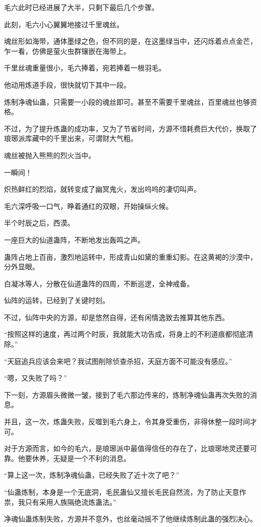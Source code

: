 \begin{this_body}
毛六此时已经进展了大半，只剩下最后几个步骤。

此刻，毛六小心翼翼地接过千里魂丝。

魂丝形如海带，通体墨绿之色，但不同的是，在这墨绿当中，还闪烁着点点金芒，乍一看，仿佛是萤火虫群镶嵌在海带上。

千里丝魂重量很小，毛六捧着，宛若捧着一根羽毛。

他动用炼道手段，很快就切下其中一段。

炼制净魂仙蛊，只需要一小段的魂丝即可。甚至不需要千里魂丝，百里魂丝也够资格。

不过，为了提升炼蛊的成功率，又为了节省时间，方源不惜耗费巨大代价，换取了琅琊派库藏中的千里出来，可谓财大气粗。

魂丝被抛入熊熊的烈火当中。

一瞬间！

炽热鲜红的烈焰，就转变成了幽冥鬼火，发出呜呜的凄切叫声。

毛六深呼吸一口气，睁着通红的双眼，开始操纵火候。

半个时辰之后，西漠。

一座巨大的仙道蛊阵，不断地发出轰鸣之声。

蛊阵占地上百亩，激烈地运转中，形成青山如黛的重重幻影。在这黄褐的沙漠中，分外显眼。

白凝冰等人，分散在仙道蛊阵的四周，不断巡逻，全神戒备。

仙阵的运转，已经到了关键时刻。

不过，仙阵中央的方源，却是悠然自得，还有闲情逸致去推算其他东西。

“按照这样的速度，再过两个时辰，我就能大功告成，将身上的不利道痕都彻底清除。”

“天庭追兵应该会来吧？我试图削除侦查杀招，天庭方面不可能没有感应。”

“嗯，又失败了吗？”

下一刻，方源眉头微微一皱，接到了毛六那边传来的，炼制净魂仙蛊再次失败的消息。

并且，这一次，炼蛊失败，反噬到毛六身上，令其身受重伤，非得休整一段时间才可。

对于方源而言，如今的毛六，是琅琊派中最值得信任的存在了，比琅琊地灵还要可靠。他要休养，无疑是一个不利的消息。

“算上这一次，炼制净魂仙蛊，已经失败了近十次了吧？”

“仙蛊炼制，本身是一个无底洞，毛民蛊仙又擅长毛民自然流，为了防止天意作祟，我只有采用人族隔绝流炼蛊法。”

净魂仙蛊炼制失败，方源并不意外，也丝毫动摇不了他继续炼制此蛊的强烈决心。


\end{this_body}
